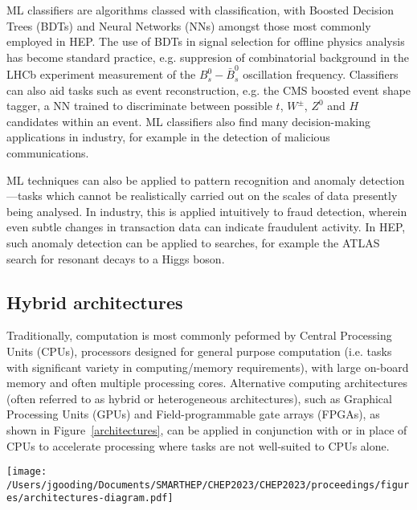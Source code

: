 ML classifiers are algorithms classed with classification, with Boosted Decision Trees (BDTs) and Neural Networks (NNs) amongst those most commonly employed in HEP. The use of BDTs in signal selection for offline physics analysis has become standard practice, e.g. suppresion of combinatorial background in the LHCb experiment measurement of the $B_s^0-\bar{B}_s^0$ oscillation frequency. \cite{delta-ms} Classifiers can also aid tasks such as event reconstruction, e.g. the CMS boosted event shape tagger, a NN trained to discriminate between possible $t$, $W^\pm$, $Z^0$ and $H$ candidates within an event. \cite{CMS-best} ML classifiers also find many decision-making applications in industry, for example in the detection of malicious communications. \cite{classifier-phishing}

ML techniques can also be applied to pattern recognition and anomaly detection—tasks which cannot be realistically carried out on the scales of data presently being analysed. In industry, this is applied intuitively to fraud detection, wherein even subtle changes in transaction  data can indicate fraudulent activity. \cite{fraud-detection} In HEP, such anomaly detection can be applied to searches, for example the ATLAS search for resonant decays to a Higgs boson. \cite{anomaly-hep}

\subsection{Hybrid architectures}
\label{hybrid-architectures}
Traditionally, computation is most commonly peformed by Central Processing Units (CPUs), processors designed for general purpose computation (i.e. tasks with significant variety in computing/memory requirements), with large on-board memory and often multiple processing cores. Alternative computing architectures (often referred to as hybrid or heterogeneous architectures), such as Graphical Processing Units (GPUs) and Field-programmable gate arrays (FPGAs), as shown in Figure~\ref{architectures}, can be applied in conjunction with or in place of CPUs to accelerate processing where tasks are not well-suited to CPUs alone. \cite{architectures}\par

\begin{figure*}[h!]
    \centering
    \texttt{[image: /Users/jgooding/Documents/SMARTHEP/CHEP2023/CHEP2023/proceedings/figures/architectures-diagram.pdf]}
    \caption{Comparison of CPU, GPU and FPGA architectures, illustrated as schematic diagrams. GPUs typically contain a greater proportion of computational resources than CPUs, with these resources subdivided within each multiprocessor to provide better parallel computing performance. FPGAs take a different approach, comprising of many control blocks connected to memoery/IO interface and to one another via switches. \cite{architectures}}
    \label{architectures}       %
\end{figure*}

